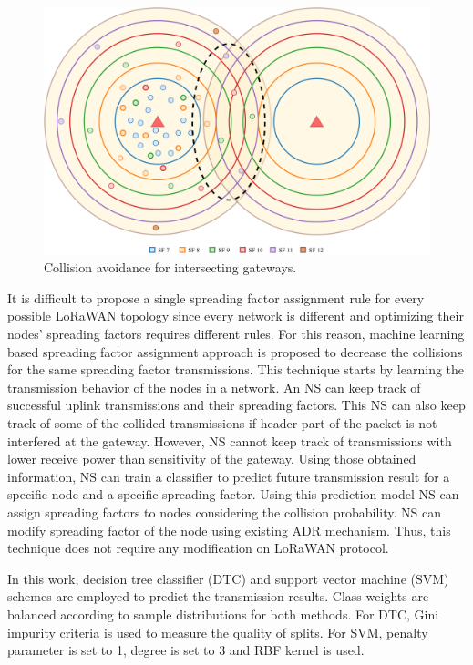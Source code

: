 \begin{figure}
\centering
\includegraphics[width=\linewidth]{fig/lora_multi_gw_collision_fix.png}
\vspace*{4mm}
\caption{Collision avoidance for intersecting gateways.}
\label{fig:collision_solution_multi_gw}
\end{figure}

It is difficult to propose a single spreading factor assignment rule for every possible LoRaWAN topology since every network is different and optimizing their nodes' spreading factors requires different rules. For this reason, machine learning based spreading factor assignment approach is proposed to decrease the collisions for the same spreading factor transmissions. This technique starts by learning the transmission behavior of the nodes in a network. An NS can keep track of successful uplink transmissions and their spreading factors. This NS can also keep track of some of the collided transmissions if header part of the packet is not interfered at the gateway. However, NS cannot keep track of transmissions with lower receive power than sensitivity of the gateway. Using those obtained information, NS can train a classifier to predict future transmission result for a specific node and a specific spreading factor. Using this prediction model NS can assign spreading factors to nodes considering the collision probability. NS can modify spreading factor of the node using existing ADR mechanism. Thus, this technique does not require any modification on LoRaWAN protocol.

In this work, decision tree classifier (DTC) and support vector machine (SVM) \cite{Alpaydin} schemes are employed to predict the transmission results. Class weights are balanced according to sample distributions for both methods. For DTC, Gini impurity criteria is used to measure the quality of splits. For SVM, penalty parameter is set to 1, degree is set to 3 and RBF kernel is used.

